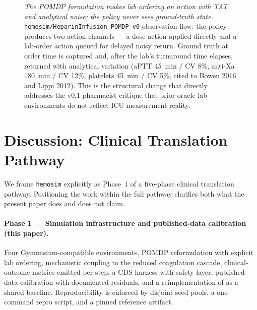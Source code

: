 \documentclass[11pt]{article}
\begin{document}
\begin{figure}[ht]
  \caption{\emph{The POMDP formulation makes lab ordering an action with TAT and analytical noise; the policy never sees ground-truth state.} \texttt{hemosim/HeparinInfusion-POMDP-v0} observation flow: the policy produces two action channels --- a dose action applied directly and a lab-order action queued for delayed noisy return. Ground truth at order time is captured and, after the lab's turnaround time elapses, returned with analytical variation (aPTT 45~min / CV 8\%, anti-Xa 180~min / CV 12\%, platelets 45~min / CV 5\%, cited to Bowen 2016 and Lippi 2012). This is the structural change that directly addresses the v0.1 pharmacist critique that prior oracle-lab environments do not reflect ICU measurement reality.}
  \label{fig:pomdp_flow}
\end{figure}

\section{Discussion: Clinical Translation Pathway}
\label{sec:discussion}

We frame \texttt{hemosim} explicitly as Phase~1 of a five-phase clinical translation pathway. Positioning the work within the full pathway clarifies both what the present paper does and does not claim.

\paragraph{Phase 1 --- Simulation infrastructure and published-data calibration (this paper).}
Four Gymnasium-compatible environments, POMDP reformulation with explicit lab ordering, mechanistic coupling to the reduced coagulation cascade, clinical-outcome metrics emitted per-step, a CDS harness with safety layer, published-data calibration with documented residuals, and a reimplementation of \citet{nemati2016} as a shared baseline. Reproducibility is enforced by disjoint seed pools, a one-command repro script, and a pinned reference artifact.
\end{document}
